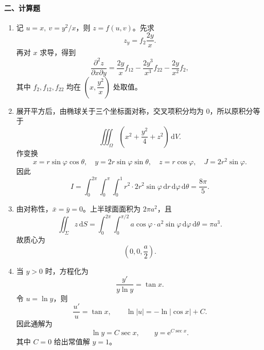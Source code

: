 \paragraph*{二、计算题}
\begin{enumerate}
  \item 记 \(u=x,\ v=y^2/x\)，则 \(z=f(u,v)\)。先求
  \[
    z_y=f_2\frac{2y}{x}.
  \]
  再对 \(x\) 求导，得到
  \[
    \frac{\partial^2z}{\partial x\partial y}
    =\frac{2y}{x}f_{12}-\frac{2y^3}{x^3}f_{22}-\frac{2y}{x^2}f_2,
  \]
  其中 \(f_2,f_{12},f_{22}\) 均在 \(\left(x,\dfrac{y^2}{x}\right)\) 处取值。

  \item 展开平方后，由椭球关于三个坐标面对称，交叉项积分均为 \(0\)，所以原积分等于
  \[
    \iiint_\Omega\left(x^2+\frac{y^2}{4}+z^2\right)\,\mathrm{d}V.
  \]
  作变换
  \[
    x=r\sin\varphi\cos\theta,\quad
    y=2r\sin\varphi\sin\theta,\quad
    z=r\cos\varphi,\quad J=2r^2\sin\varphi.
  \]
  因此
  \[
    I=\int_0^{2\pi}\!\!\int_0^\pi\!\!\int_0^1 r^2\cdot2r^2\sin\varphi\,\mathrm{d}r\,\mathrm{d}\varphi\,\mathrm{d}\theta
    =\frac{8\pi}{5}.
  \]

  \item 由对称性，\(\bar x=\bar y=0\)。上半球面面积为 \(2\pi a^2\)，且
  \[
    \iint_\Sigma z\,\mathrm{d}S
    =\int_0^{2\pi}\!\!\int_0^{\pi/2}a\cos\varphi\cdot a^2\sin\varphi\,\mathrm{d}\varphi\,\mathrm{d}\theta
    =\pi a^3.
  \]
  故质心为
  \[
    \left(0,0,\frac a2\right).
  \]

  \item 当 \(y>0\) 时，方程化为
  \[
    \frac{y'}{y\ln y}=\tan x.
  \]
  令 \(u=\ln y\)，则
  \[
    \frac{u'}u=\tan x,\qquad \ln|u|=-\ln|\cos x|+C.
  \]
  因此通解为
  \[
    \ln y=C\sec x,\qquad y=\mathrm{e}^{C\sec x}.
  \]
  其中 \(C=0\) 给出常值解 \(y=1\)。
\end{enumerate}

